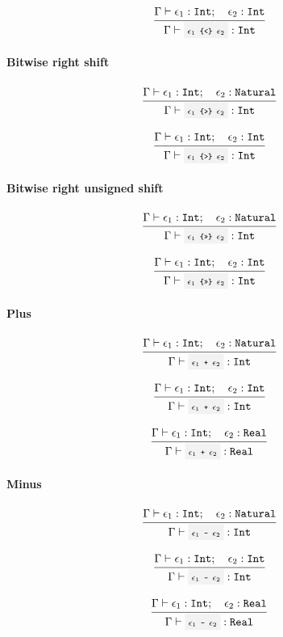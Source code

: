 \[
	\infrule{
		\EnvSym\then \expr_1:\Int \semiq \expr_2:\Int
	}{
		\EnvSym\then \code{$\expr_1$ \{<\} $\expr_2$} : \Int
	}
\]

\paragraph{Bitwise right shift}

\[
	\infrule{
		\EnvSym\then \expr_1:\Int \semiq \expr_2:\Natural
	}{
		\EnvSym\then \code{$\expr_1$ \{>\} $\expr_2$} : \Int
	}
\]

\[
	\infrule{
		\EnvSym\then \expr_1:\Int \semiq \expr_2:\Int
	}{
		\EnvSym\then \code{$\expr_1$ \{>\} $\expr_2$} : \Int
	}
\]

\paragraph{Bitwise right unsigned shift}

\[
	\infrule{
		\EnvSym\then \expr_1:\Int \semiq \expr_2:\Natural
	}{
		\EnvSym\then \code{$\expr_1$ \{>>\} $\expr_2$} : \Int
	}
\]

\[
	\infrule{
		\EnvSym\then \expr_1:\Int \semiq \expr_2:\Int
	}{
		\EnvSym\then \code{$\expr_1$ \{>>\} $\expr_2$} : \Int
	}
\]

\paragraph{Plus}

\[
	\infrule{
		\EnvSym\then \expr_1:\Int \semiq \expr_2:\Natural
	}{
		\EnvSym\then \code{$\expr_1$ + $\expr_2$} : \Int
	}
\]

\[
	\infrule{
		\EnvSym\then \expr_1:\Int \semiq \expr_2:\Int
	}{
		\EnvSym\then \code{$\expr_1$ + $\expr_2$} : \Int
	}
\]

\[
	\infrule{
		\EnvSym\then \expr_1:\Int \semiq \expr_2:\Real
	}{
		\EnvSym\then \code{$\expr_1$ + $\expr_2$} : \Real
	}
\]

\paragraph{Minus}

\[
	\infrule{
		\EnvSym\then \expr_1:\Int \semiq \expr_2:\Natural
	}{
		\EnvSym\then \code{$\expr_1$ - $\expr_2$} : \Int
	}
\]

\[
	\infrule{
		\EnvSym\then \expr_1:\Int \semiq \expr_2:\Int
	}{
		\EnvSym\then \code{$\expr_1$ - $\expr_2$} : \Int
	}
\]

\[
	\infrule{
		\EnvSym\then \expr_1:\Int \semiq \expr_2:\Real
	}{
		\EnvSym\then \code{$\expr_1$ - $\expr_2$} : \Real
	}
\]

